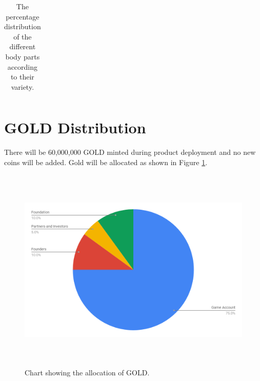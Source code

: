 \documentclass[12pt]{article}
\begin{document}
\begin{table}[!ht]
\begin{tabular}{p{0.84in}p{0.84in}}
\end{tabular}\caption{The percentage distribution of the different body parts according to their variety.}
\label{tab:The percentage distribution of the different body parts according to their variety.}

 \end{table}


\newpage

\vspace{\baselineskip}\section{GOLD Distribution}
\label{GOLD Distribution} \par

There will be 60,000,000 GOLD minted during product deployment and no new coins will be added. Gold will be allocated as shown in Figure \ref{fig:Chart_showing_the_allocation_of_GOLD}.\par




\begin{figure}[H]
	\begin{FlushLeft}		\includegraphics[width=6.27in,height=3.88in]{./media/image26.png}
		\caption{Chart showing the allocation of GOLD.}
		\label{fig:Chart_showing_the_allocation_of_GOLD}
	\end{FlushLeft}\end{figure}
\end{document}
